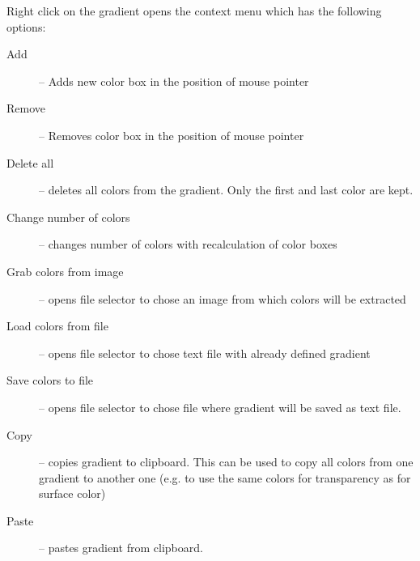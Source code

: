 Right click on the gradient opens the context menu which has the following options:
\nopagebreak
\begin{description}
	\item[Add] -- Adds new color box in the position of mouse pointer
	\item[Remove] -- Removes color box in the position of mouse pointer
	\item[Delete all] -- deletes all colors from the gradient. Only the first and last color are kept.
	\item[Change number of colors] -- changes number of colors with recalculation of color boxes
	\item[Grab colors from image] -- opens file selector to chose an image from which colors will be extracted
	\item[Load colors from file] -- opens file selector to chose text file with already defined gradient
	\item[Save colors to file] -- opens file selector to chose file where gradient will be saved as text file.
	\item[Copy] -- copies gradient to clipboard. This can be used to copy all colors from one gradient to another one (e.g. to use the same colors for transparency as for surface color)
	\item[Paste] -- pastes gradient from clipboard. 
\end{description}

